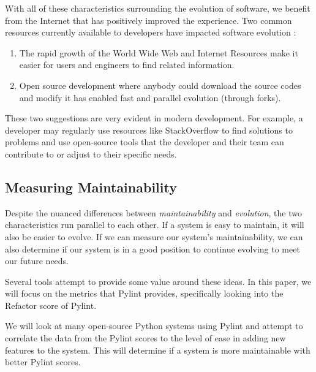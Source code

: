 With all of these characteristics surrounding the evolution of software, we benefit from the Internet that has positively improved the experience. Two common resources currently available to developers have impacted software evolution \cite{wiki:software-evolution}:

\vspace{0.25cm}
\begin{enumerate}
    \item The rapid growth of the World Wide Web and Internet Resources make it easier for users and engineers to find related information.
    \item Open source development where anybody could download the source codes and modify it has enabled fast and parallel evolution (through forks).
\end{enumerate}
\vspace{0.25cm}

These two suggestions are very evident in modern development. For example, a developer may regularly use resources like StackOverflow to find solutions to problems and use open-source tools that the developer and their team can contribute to or adjust to their specific needs.

\subsection{Measuring Maintainability} \label{subMeasureMaintainability}

Despite the nuanced differences between \textit{maintainability} and \textit{evolution}, the two characteristics run parallel to each other. If a system is easy to maintain, it will also be easier to evolve. If we can measure our system's maintainability, we can also determine if our system is in a good position to continue evolving to meet our future needs.

Several tools attempt to provide some value around these ideas. In this paper, we will focus on the metrics that Pylint provides, specifically looking into the Refactor score of Pylint.

We will look at many open-source Python systems using Pylint and attempt to correlate the data from the Pylint scores to the level of ease in adding new features to the system. This will determine if a system is more maintainable with better Pylint scores. 

